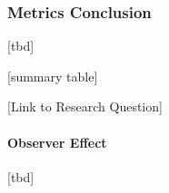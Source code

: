 

\subsubsection{Metrics Conclusion}


[tbd]


[summary table]



[Link to Research Question]


\paragraph{Observer Effect}

[tbd]













